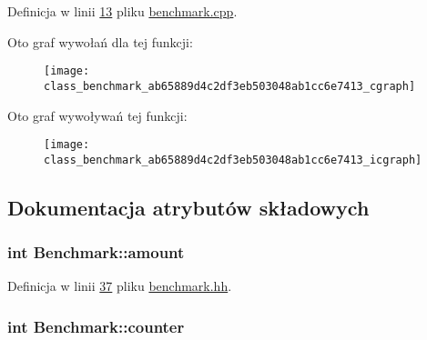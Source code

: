 Definicja w linii \hyperlink{benchmark_8cpp_source_l00013}{13} pliku \hyperlink{benchmark_8cpp_source}{benchmark.\-cpp}.



Oto graf wywołań dla tej funkcji\-:\nopagebreak
\begin{figure}[H]
\begin{center}
\leavevmode
\texttt{[image: class\_benchmark\_ab65889d4c2df3eb503048ab1cc6e7413\_cgraph]}
\end{center}
\end{figure}




Oto graf wywoływań tej funkcji\-:
\nopagebreak
\begin{figure}[H]
\begin{center}
\leavevmode
\texttt{[image: class\_benchmark\_ab65889d4c2df3eb503048ab1cc6e7413\_icgraph]}
\end{center}
\end{figure}




\subsection{Dokumentacja atrybutów składowych}
\hypertarget{class_benchmark_a1d0eaa6febe9b7a7f5f5147e83f60910}{
\subsubsection[{amount}]{\setlength{\rightskip}{0pt plus 5cm}int Benchmark\-::amount\hspace{0.3cm}{\ttfamily [private]}}}\label{class_benchmark_a1d0eaa6febe9b7a7f5f5147e83f60910}


Definicja w linii \hyperlink{benchmark_8hh_source_l00037}{37} pliku \hyperlink{benchmark_8hh_source}{benchmark.\-hh}.

\hypertarget{class_benchmark_a3a56c7dad0b21e490f3024d5d0027f31}{
\subsubsection[{counter}]{\setlength{\rightskip}{0pt plus 5cm}int Benchmark\-::counter\hspace{0.3cm}{\ttfamily [private]}}}\label{class_benchmark_a3a56c7dad0b21e490f3024d5d0027f31}


